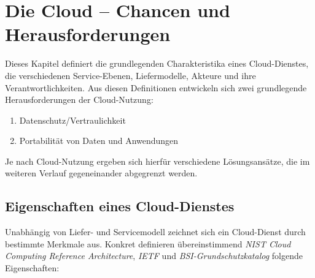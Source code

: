 \chapter{Die Cloud -- Chancen und Herausforderungen}

Dieses Kapitel definiert die grundlegenden Charakteristika eines Cloud-Dienstes, die verschiedenen Service-Ebenen, Liefermodelle, Akteure und ihre Verantwortlichkeiten. Aus diesen Definitionen entwickeln sich zwei grundlegende Herausforderungen der Cloud-Nutzung:

\begin{enumerate}
	\item Datenschutz/Vertraulichkeit
	\item Portabilität von Daten und Anwendungen
\end{enumerate}

\noindent Je nach Cloud-Nutzung ergeben sich hierfür verschiedene Lösungsansätze, die im weiteren Verlauf gegeneinander abgegrenzt werden.

\section{Eigenschaften eines Cloud-Dienstes}

Unabhängig von Liefer- und Servicemodell zeichnet sich ein Cloud-Dienst durch bestimmte Merkmale aus. Konkret definieren übereinstimmend \emph{NIST Cloud Computing Reference Architecture}, \emph{IETF} und \emph{BSI-Grundschutzkatalog} folgende Eigenschaften:

